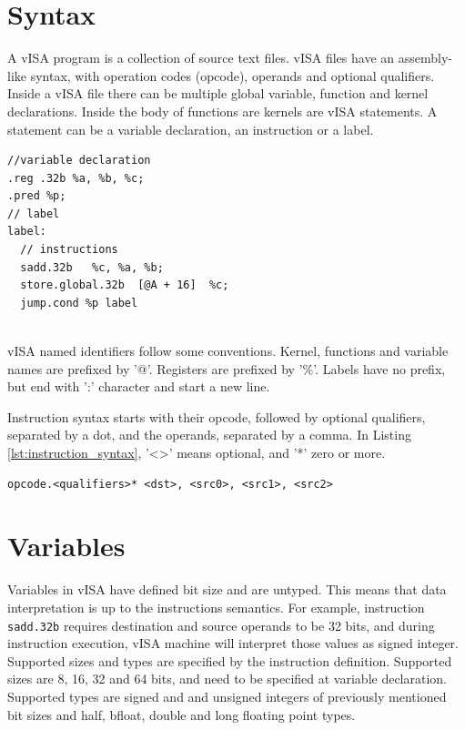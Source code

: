\section{Syntax}

A vISA program is a collection of source text files. vISA files have an
assembly-like syntax, with operation codes (opcode), operands and optional
qualifiers. Inside a vISA file there can be multiple global variable, function
and kernel declarations. Inside the body of functions are kernels are vISA
statements. A statement can be a variable declaration, an instruction or a
label.

\begin{lstlisting}
//variable declaration
.reg .32b %a, %b, %c;
.pred %p;
// label
label:
  // instructions
  sadd.32b   %c, %a, %b;
  store.global.32b  [@A + 16]  %c;
  jump.cond %p label
  
\end{lstlisting}

vISA named identifiers follow some conventions. Kernel, functions and variable
names are prefixed by '@'. Registers are prefixed by '\%'. Labels have no
prefix, but end with ':' character and start a new line.

Instruction syntax starts with their opcode, followed by optional qualifiers,
separated by a dot, and the operands, separated by a comma. In Listing
\ref{lst:instruction_syntax}, '<>' means optional, and '*' zero or more.

\begin{lstlisting}[label={lst:instruction_syntax}]
    opcode.<qualifiers>* <dst>, <src0>, <src1>, <src2>
\end{lstlisting}

\section{Variables}

Variables in vISA have defined bit size and are untyped. This means that data
interpretation is up to the instructions semantics. For example, instruction
\lstinline{sadd.32b} requires destination and source operands to be 32 bits,
and during instruction execution, vISA machine will interpret those values as
signed integer. Supported sizes and types are specified by the instruction
definition. Supported sizes are 8, 16, 32 and 64 bits, and need to be specified
at variable declaration. Supported types are signed and and unsigned integers
of previously mentioned bit sizes and half, bfloat, double and long floating
point types.

